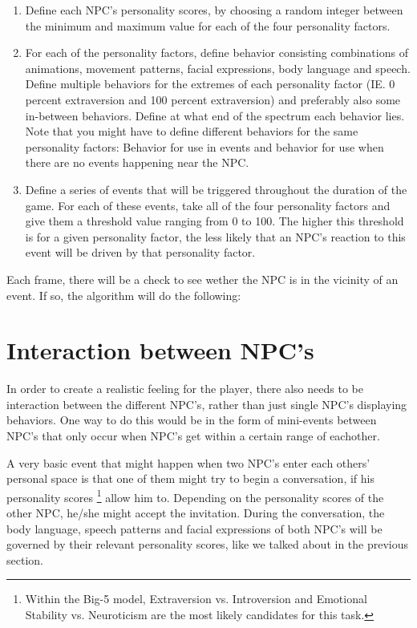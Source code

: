 \documentclass{article}
\begin{document}
    \begin{enumerate}
    	\item Define each NPC's personality scores, by choosing a random integer between the minimum and maximum value for each of the four personality factors.
    	\item For each of the personality factors, define behavior consisting combinations of animations, movement patterns, facial expressions, body language and speech. Define multiple behaviors for the extremes of each personality factor (IE. 0 percent extraversion and 100 percent extraversion) and preferably also some in-between behaviors. Define at what end of the spectrum each behavior lies. Note that you might have to define different behaviors for the same personality factors: Behavior for use in events and behavior for use when there are no events happening near the NPC.%
    	\item Define a series of events that will be triggered throughout the duration of the game. For each of these events, take all of the four personality factors and give them a threshold value ranging from 0 to 100. The higher this threshold is for a given personality factor, the less likely that an NPC's reaction to this event will be driven by that personality factor.
    \end{enumerate}

    Each frame, there will be a check to see wether the NPC is in the vicinity of an event. If so, the algorithm will do the following:


	\newpage
	\section{Interaction between NPC's}
	In order to create a realistic feeling for the player, there also needs to be interaction between the different NPC's, rather than just single NPC's displaying behaviors. One way to do this would be in the form of mini-events between NPC's that only occur when NPC's get within a certain range of eachother. 

	A very basic event that might happen when two NPC's enter each others' personal space is that one of them might try to begin a conversation, if his personality scores \footnote{Within the Big-5 model, Extraversion vs. Introversion and Emotional Stability vs. Neuroticism are the most likely candidates for this task.} allow him to. Depending on the personality scores of the other NPC, he/she might accept the invitation. During the conversation, the body language, speech patterns and facial expressions of both NPC's will be governed by their relevant personality scores, like we talked about in the previous section.
\end{document}
